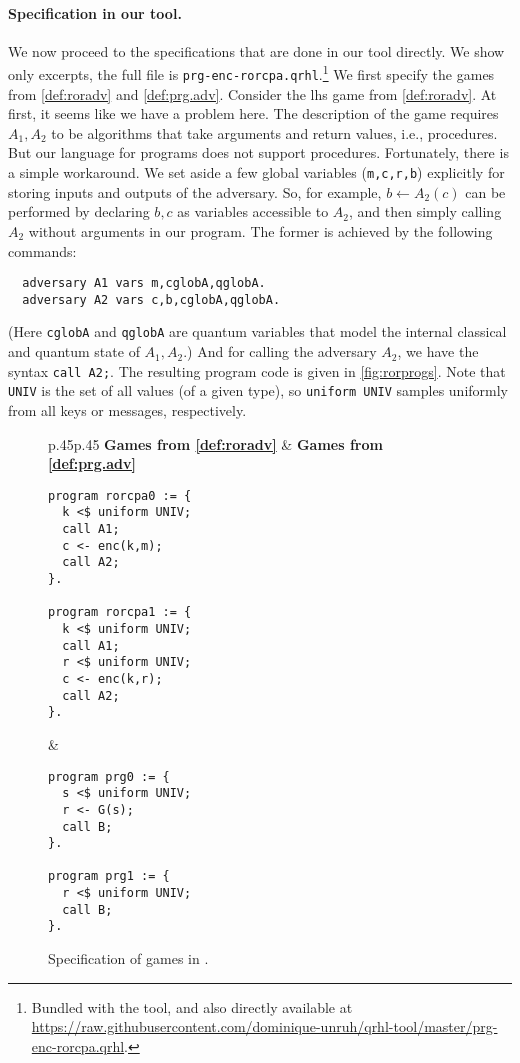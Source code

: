 \documentclass{article}
\newcommand\giturl[1]{\url{https://raw.githubusercontent.com/dominique-unruh/qrhl-tool/master/#1}}
\begin{document}
\paragraph{Specification in our tool.} We now proceed to the
specifications that are done in our tool directly. We show only
excerpts, the full file is
\texttt{prg-enc-rorcpa.qrhl}.\footnote{Bundled with the tool, and also
  directly available at \giturl{prg-enc-rorcpa.qrhl}.}  We first specify the games
from \autoref{def:roradv} and \autoref{def:prg.adv}. Consider the lhs
game from \autoref{def:roradv}. At first, it seems like we have a
problem here. The description of the game requires $A_1,A_2$
to be algorithms that take arguments and return values, i.e.,
procedures. But our language for programs does not support
procedures. Fortunately, there is a simple workaround. We set aside a
few global variables (\texttt{m,c,r,b}) explicitly for storing inputs
and outputs of the adversary. So, for example, $b\leftarrow A_2(c)$
can be performed by declaring $b,c$
as variables accessible to $A_2$,
and then simply calling $A_2$
without arguments in our program. The former is achieved by the
following commands:
\begin{lstlisting}
  adversary A1 vars m,cglobA,qglobA.
  adversary A2 vars c,b,cglobA,qglobA.
\end{lstlisting}
(Here \texttt{cglobA} and \texttt{qglobA} are quantum variables that
model the internal classical and quantum state of $A_1,A_2$.)
And for calling the adversary $A_2$,
we have the syntax \texttt{call A2;}. The resulting program code is
given in \autoref{fig:rorprogs}. Note that \texttt{UNIV} is the set of
all values (of a given type), so \texttt{uniform UNIV} samples
uniformly from all keys or messages, respectively.

\begin{figure}[t]\centering
  \lstset{aboveskip=0pt,belowskip=0pt,frame=single}
  \centering
  \begin{tabular}{p{.45\hsize}p{.45\hsize}}
    \textbf{Games from \autoref{def:roradv}}
    &
    \textbf{Games from \autoref{def:prg.adv}}
    \\[-5pt]
    \begin{lstlisting}
program rorcpa0 := {
  k <$ uniform UNIV;
  call A1;
  c <- enc(k,m);
  call A2;
}.

program rorcpa1 := {
  k <$ uniform UNIV;
  call A1;
  r <$ uniform UNIV;
  c <- enc(k,r);
  call A2;
}.
\end{lstlisting}
    &
      \begin{lstlisting}
program prg0 := {
  s <$ uniform UNIV;
  r <- G(s);
  call B;
}.

program prg1 := {
  r <$ uniform UNIV;
  call B;
}.
\end{lstlisting}
  \end{tabular}
  \vspace*{-5mm}
  \caption{Specification of games in .}
  \label{fig:rorprogs}
\end{figure}
\end{document}
